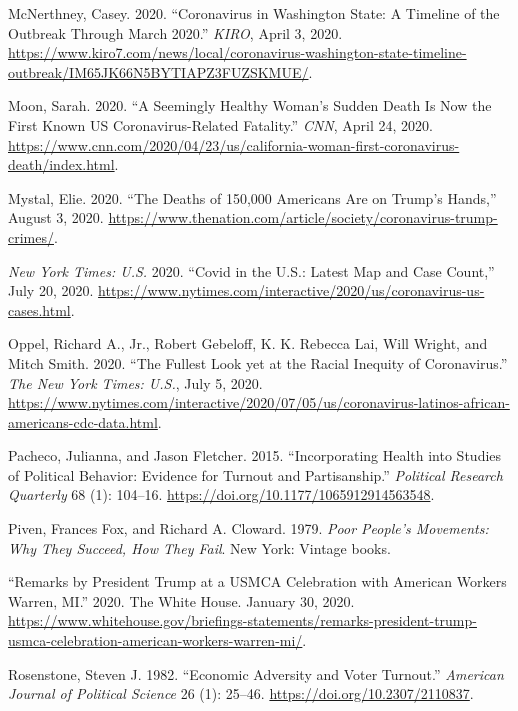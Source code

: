\documentclass[
  12pt,
]{article}
\newlength{\cslhangindent}
\newenvironment{cslreferences}%
  {\setlength{\parindent}{0pt}%
  \everypar{\setlength{\hangindent}{\cslhangindent}}\ignorespaces}%
  {\par}
\begin{document}
\begin{cslreferences}
\leavevmode\hypertarget{ref-McNerthney2020}{}%
McNerthney, Casey. 2020. ``Coronavirus in Washington State: A Timeline of the Outbreak Through March 2020.'' \emph{KIRO}, April 3, 2020. \url{https://www.kiro7.com/news/local/coronavirus-washington-state-timeline-outbreak/IM65JK66N5BYTIAPZ3FUZSKMUE/}.

\leavevmode\hypertarget{ref-Moon2020}{}%
Moon, Sarah. 2020. ``A Seemingly Healthy Woman's Sudden Death Is Now the First Known US Coronavirus-Related Fatality.'' \emph{CNN}, April 24, 2020. \url{https://www.cnn.com/2020/04/23/us/california-woman-first-coronavirus-death/index.html}.

\leavevmode\hypertarget{ref-Mystal2020}{}%
Mystal, Elie. 2020. ``The Deaths of 150,000 Americans Are on Trump's Hands,'' August 3, 2020. \url{https://www.thenation.com/article/society/coronavirus-trump-crimes/}.

\leavevmode\hypertarget{ref-nyt2020}{}%
\emph{New York Times: U.S.} 2020. ``Covid in the U.S.: Latest Map and Case Count,'' July 20, 2020. \url{https://www.nytimes.com/interactive/2020/us/coronavirus-us-cases.html}.

\leavevmode\hypertarget{ref-Oppel2020}{}%
Oppel, Richard A., Jr., Robert Gebeloff, K. K. Rebecca Lai, Will Wright, and Mitch Smith. 2020. ``The Fullest Look yet at the Racial Inequity of Coronavirus.'' \emph{The New York Times: U.S.}, July 5, 2020. \url{https://www.nytimes.com/interactive/2020/07/05/us/coronavirus-latinos-african-americans-cdc-data.html}.

\leavevmode\hypertarget{ref-Pacheco2015}{}%
Pacheco, Julianna, and Jason Fletcher. 2015. ``Incorporating Health into Studies of Political Behavior: Evidence for Turnout and Partisanship.'' \emph{Political Research Quarterly} 68 (1): 104--16. \url{https://doi.org/10.1177/1065912914563548}.

\leavevmode\hypertarget{ref-Piven1979}{}%
Piven, Frances Fox, and Richard A. Cloward. 1979. \emph{Poor People's Movements: Why They Succeed, How They Fail}. New York: Vintage books.

\leavevmode\hypertarget{ref-whitehouse2020}{}%
``Remarks by President Trump at a USMCA Celebration with American Workers \textbar{} Warren, MI.'' 2020. The White House. January 30, 2020. \url{https://www.whitehouse.gov/briefings-statements/remarks-president-trump-usmca-celebration-american-workers-warren-mi/}.

\leavevmode\hypertarget{ref-Rosenstone1982}{}%
Rosenstone, Steven J. 1982. ``Economic Adversity and Voter Turnout.'' \emph{American Journal of Political Science} 26 (1): 25--46. \url{https://doi.org/10.2307/2110837}.


\end{cslreferences}
\end{document}
